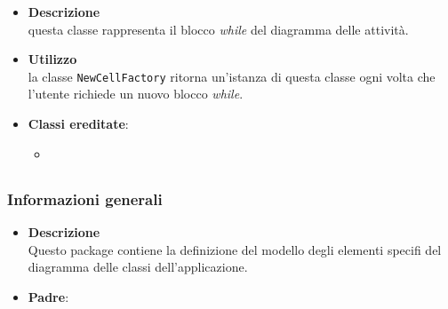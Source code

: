 \label{\nogloxy{swedesigner::client::model::celltypes::activity::HxWhile}}
\begin{itemize}
\item \textbf{Descrizione}\\
questa classe rappresenta il blocco \emph{while} del diagramma delle attività.
\item \textbf{Utilizzo}\\
la classe \texttt{NewCellFactory} ritorna un'istanza di questa classe ogni volta che l'utente richiede un nuovo blocco \emph{while}.
\item \textbf{Classi ereditate}:
\begin{itemize}
\item \hyperref[\nogloxy{swedesigner::client::model::celltypes::activity::ActivityDiagramElement}]{}
\end{itemize}
\end{itemize}
\subsection{}
\label{\nogloxy{swedesigner::client::model::celltypes::class}}
\subsubsection{Informazioni generali}
\begin{itemize}
\item \textbf{Descrizione}\\
Questo package contiene la definizione del modello degli elementi specifi del diagramma delle classi dell'applicazione.
\item \textbf{Padre}: \hyperref[\nogloxy{swedesigner::client::model::celltypes}]{}
\end{itemize}
